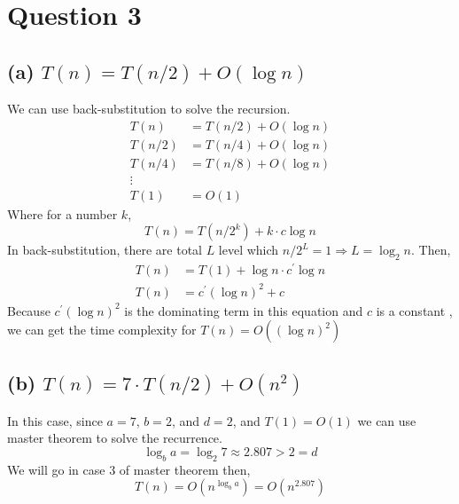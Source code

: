 \documentclass{article}
\begin{document}
\section*{Question 3}
\subsection*{(a) $T(n) = T(n/2) + O(\log n)$}
We can use back-substitution to solve the recursion.
    \begin{align}
        T(n) & = T(n/2) + O(\log n) \nonumber \\
        T(n/2) & = T(n/4) +  O(\log n) \nonumber \\
        T(n/4) &= T(n/8) + O(\log n) \nonumber \\
        \vdots \nonumber \\
        T(1) &= O(1) \nonumber
    \end{align}
Where for a number $k$,
$$T(n) = T(n/2^k) + k\cdot c \log n$$
In back-substitution, there are total $L$ level which $n/2^L = 1 \Rightarrow L = \log_2 n$.
Then, 
    \begin{align}
        T(n) &= T(1) + \log n \cdot c^\prime \log n \nonumber \\
        T(n) &= c^\prime (\log n)^2 +  c \nonumber 
    \end{align}
    Because $c^\prime  (\log n)^2$ is the dominating term in this equation and $c$ is a constant
    , we can get the time complexity for $T(n) = O((\log n)^2)$

\subsection*{(b) $T(n) = 7\cdot T(n/2) + O(n^2)$}
In this case, since $a = 7$, $b = 2$, and $d = 2$, and $T(1) = O(1)$ we can use master theorem to solve the recurrence.
$$\log_b a = \log_2 7 \approx 2.807 > 2 = d $$
We will go in case 3 of master theorem then,
$$T(n) = O(n^{\log_b a}) = O(n^{2.807})$$
\end{document}
